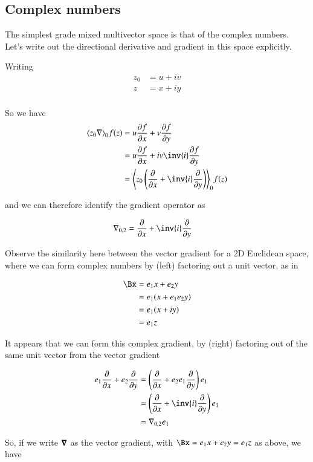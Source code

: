 \subsection{Complex numbers }

The simplest grade mixed multivector space is that of the complex numbers.  Let's write out the
directional derivative and gradient in this space explicitly.

Writing 
\begin{align*}
z_0 &= u + i v \\
z &= x + i y \\
\end{align*}

So we have
\begin{align*}
\gpgradezero{z_0 \grad} f(z) 
&= u \PD{x}{f} + v \PD{y}{f} \\
&= u \PD{x}{f} + i v \inv{i} \PD{y}{f} \\
&= \gpgradezero{ z_0 \left( \PD{x}{} + \inv{i} \PD{y}{} \right) } f(z) \\
\end{align*}

and we can therefore identify the gradient operator as

\begin{align*}
\grad_{0,2} &= \PD{x}{} + \inv{i} \PD{y}{} 
\end{align*}

Observe the similarity here between the vector gradient for a 2D Euclidean space, where we can form complex numbers by (left) factoring out a 
unit vector, as in

\begin{align*}
\Bx 
&= e_1 x + e_2 y \\
&= e_1 ( x + e_1 e_2 y ) \\
&= e_1 ( x + i y ) \\
&= e_1 z
\end{align*}

It appears that we can form this complex gradient, by (right) factoring out of the same unit vector from the vector gradient

\begin{align*}
e_1 \PD{x}{} + e_2 \PD{y}{} 
&=
\left( \PD{x}{} + e_2 e_1 \PD{y}{} \right) e_1 \\
&=
\left( \PD{x}{} + \inv{i} \PD{y}{} \right) e_1 \\
&=
\grad_{0,2} e_1 \\
\end{align*}

So, if we write $\boldsymbol{\nabla}$ as the  vector gradient, with $\Bx = e_1 x + e_2 y = e_1 z$ as above, we have

